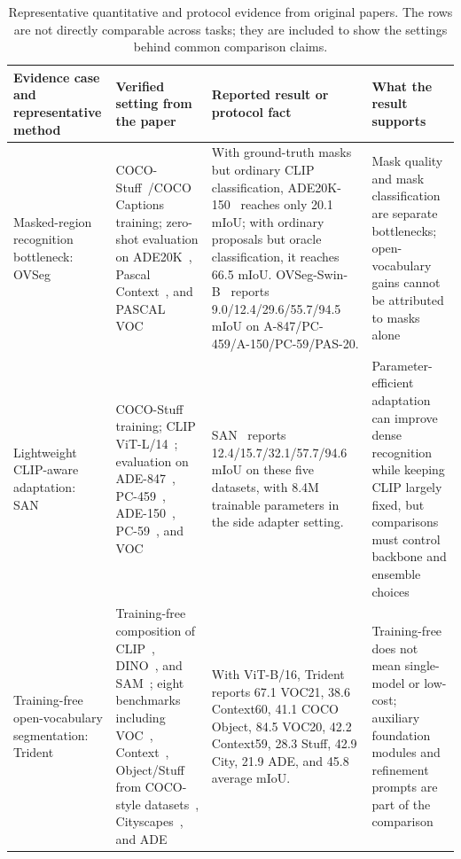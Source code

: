 \begin{table}[t]
\centering
\footnotesize
\setlength{\tabcolsep}{3pt}
\renewcommand{\arraystretch}{1.14}
\caption{Representative quantitative and protocol evidence from original papers. The rows are not directly comparable across tasks; they are included to show the settings behind common comparison claims.}
\label{tab:representative-comparison-evidence}
\begin{tabularx}{\textwidth}{>{\raggedright\arraybackslash}p{}>{\raggedright\arraybackslash}p{}>{\raggedright\arraybackslash}p{}>{\raggedright\arraybackslash}X}
\toprule
Evidence case and representative method & Verified setting from the paper & Reported result or protocol fact & What the result supports \\
\midrule
Masked-region recognition bottleneck: OVSeg~\citep{liang2023ovseg} & COCO-Stuff~\citep{caesar2018cocostuff}/COCO Captions~\citep{chen2015microsoft} training; zero-shot evaluation on ADE20K~\citep{zhou2017scene}, Pascal Context~\citep{mottaghi2014role}, and PASCAL VOC~\citep{everingham2015pascal} & With ground-truth masks but ordinary CLIP classification, ADE20K-150~\citep{zhou2017scene} reaches only 20.1 mIoU; with ordinary proposals but oracle classification, it reaches 66.5 mIoU. OVSeg-Swin-B~\citep{liang2023ovseg} reports 9.0/12.4/29.6/55.7/94.5 mIoU on A-847/PC-459/A-150/PC-59/PAS-20. & Mask quality and mask classification are separate bottlenecks; open-vocabulary gains cannot be attributed to masks alone \\
Lightweight CLIP-aware adaptation: SAN~\citep{xu2023san} & COCO-Stuff~\citep{caesar2018cocostuff} training; CLIP ViT-L/14~\citep{radford2021learning}; evaluation on ADE-847~\citep{zhou2017scene}, PC-459~\citep{mottaghi2014role}, ADE-150~\citep{zhou2017scene}, PC-59~\citep{mottaghi2014role}, and VOC~\citep{everingham2015pascal} & SAN~\citep{xu2023san} reports 12.4/15.7/32.1/57.7/94.6 mIoU on these five datasets, with 8.4M trainable parameters in the side adapter setting. & Parameter-efficient adaptation can improve dense recognition while keeping CLIP largely fixed, but comparisons must control backbone and ensemble choices \\
Training-free open-vocabulary segmentation: Trident~\citep{shiyHarnessingVisionFoundation2025} & Training-free composition of CLIP~\citep{radford2021learning}, DINO~\citep{caron2021emerging}, and SAM~\citep{kirillov2023sam}; eight benchmarks including VOC~\citep{everingham2015pascal}, Context~\citep{mottaghi2014role}, Object/Stuff from COCO-style datasets~\citep{lin2014microsoft,caesar2018cocostuff}, Cityscapes~\citep{cordts2016cityscapes}, and ADE~\citep{zhou2017scene} & With ViT-B/16, Trident~\citep{shiyHarnessingVisionFoundation2025} reports 67.1 VOC21, 38.6 Context60, 41.1 COCO Object, 84.5 VOC20, 42.2 Context59, 28.3 Stuff, 42.9 City, 21.9 ADE, and 45.8 average mIoU. & Training-free does not mean single-model or low-cost; auxiliary foundation modules and refinement prompts are part of the comparison \\

\end{tabularx}
\end{table}
